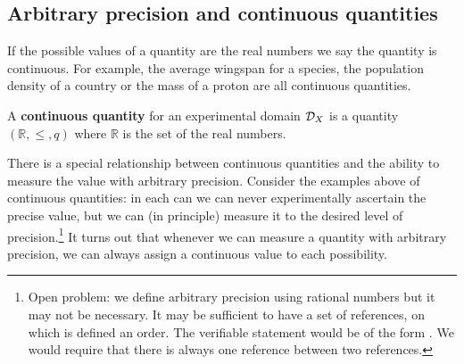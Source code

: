 \documentclass[11pt,letterpaper,fleqn]{memoir} %
\begin{document}
\subsection{Arbitrary precision and continuous quantities}

If the possible values of a quantity are the real numbers we say the quantity is continuous. For example, the average wingspan for a species, the population density of a country or the mass of a proton are all continuous quantities.

\begin{mathSection}
	\begin{defn}
		A \textbf{continuous quantity} for an experimental domain $\mathcal{D}_X$ is a quantity $(\mathbb{R}, \leq, q)$ where $\mathbb{R}$ is the set of the real numbers.
	\end{defn}
\end{mathSection}

There is a special relationship between continuous quantities and the ability to measure the value with arbitrary precision. Consider the examples above of continuous quantities: in each can we can never experimentally ascertain the precise value, but we can (in principle) measure it to the desired level of precision.\footnote{Open problem: we define arbitrary precision using rational numbers but it may not be necessary. It may be sufficient to have a set of references, on which is defined an order. The verifiable statement would be of the form . We would require that there is always one reference between two references.} It turns out that whenever we can measure a quantity with arbitrary precision, we can always assign a continuous value to each possibility.
\end{document}
